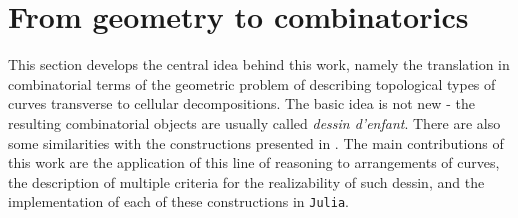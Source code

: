 \documentclass[11pt,reqno]{amsart}
\theoremstyle{plain}
\theoremstyle{definition}
\theoremstyle{remark}
\numberwithin{equation}{subsection}
\begin{document}

\section{From geometry to combinatorics}\label{sec:geocom}

This section develops the central idea behind this work, namely the translation in combinatorial terms of the geometric problem of describing topological types of curves transverse to cellular decompositions. The basic idea is not new - the resulting combinatorial objects are usually called \textit{dessin d'enfant}. There are also some similarities with the constructions presented in \cite{degtyarev2012topology}. The main contributions of this work are the application of this line of reasoning to arrangements of curves, the description of multiple criteria for the realizability of such dessin, and the implementation of each of these constructions in \texttt{Julia}.
\end{document}
